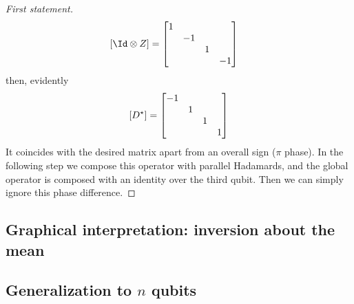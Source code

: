 \begin{proof}[First statement]
\[\begin{aligned}
        \lrS{\Id \otimes Z} &= \begin{bmatrix}
            1  & &  & \\
            & -1 &  & \\
            &  & 1  & \\
            &  & & -1
        \end{bmatrix}
    \end{aligned}
    \]
    then, evidently
    \[
        \left[{D^\star}\right] = \begin{bmatrix}
            -1 & & & \\
             & 1 & & \\
             & & 1 & \\
             & & & 1
        \end{bmatrix}
    \]
    It coincides with the desired matrix apart from an overall sign ($\pi$ phase). In the following step we compose this operator with parallel Hadamards, and the global operator is composed with an identity over the third qubit. Then we can simply ignore this phase difference.
\end{proof}

\subsection{Graphical interpretation: inversion about the mean}

\subsection{Generalization to $n$ qubits}
